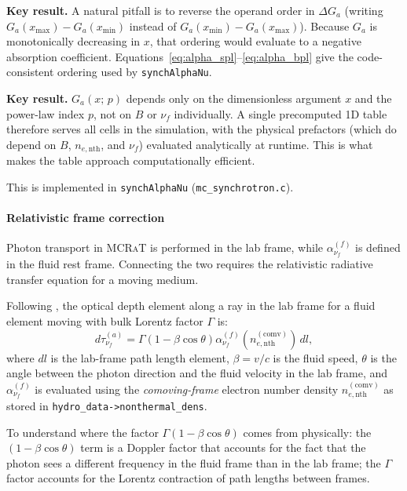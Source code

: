 \documentclass[12pt,a4paper]{article}
\newcommand{\nuf}{\nu_{\!f}}
\newcommand{\nenth}{n_{e,\mathrm{nth}}}
\newcommand{\code}[1]{\texttt{#1}}
\newcommand{\mcrat}{\textsc{MCRaT}}
\newenvironment{keyresult}{%
	\begin{framed}\noindent\textbf{Key result.}\quad}
	{\end{framed}}
\begin{document}
\begin{keyresult}
	A natural pitfall is to reverse the operand order in $\Delta G_a$
	(writing $G_a(x_{\max})-G_a(x_{\min})$ instead of
	$G_a(x_{\min})-G_a(x_{\max})$). Because $G_a$ is monotonically
	decreasing in $x$, that ordering would evaluate to a negative
	absorption coefficient. Equations~\eqref{eq:alpha_spl}--\eqref{eq:alpha_bpl}
	give the code-consistent ordering used by \code{synchAlphaNu}.
\end{keyresult}

\begin{keyresult}
	$G_a(x;\,p)$ depends only on the dimensionless argument $x$ and the
	power-law index $p$, not on $B$ or $\nuf$ individually.  A single
	precomputed 1D table therefore serves all cells in the simulation, with
	the physical prefactors (which do depend on $B$, $\nenth$, and $\nuf$)
	evaluated analytically at runtime.  This is what makes the table approach
	computationally efficient.
\end{keyresult}

This is implemented in \code{synchAlphaNu} (\code{mc\_synchrotron.c}).

\paragraph{Relativistic frame correction}
\label{sec:frame}

Photon transport in \mcrat{} is performed in the lab frame, while
$\alpha_{\nuf}^{(f)}$ is defined in the fluid rest frame.  Connecting
the two requires the relativistic radiative transfer equation for a
moving medium.

Following \citet{abramowicz1991}, the optical depth element along a ray
in the lab frame for a fluid element moving with bulk Lorentz factor
$\Gamma$ is:
\begin{equation}
	d\tau_{\nuf}^{(a)}
	= \Gamma\left(1 - \beta\cos\theta\right)
	\alpha_{\nuf}^{(f)}\!\left(\nenth^{(\mathrm{comv})}\right)
	\,dl,
	\label{eq:dtau}
\end{equation}
where $dl$ is the lab-frame path length element, $\beta = v/c$ is the
fluid speed, $\theta$ is the angle between the photon direction and the
fluid velocity in the lab frame, and $\alpha_{\nuf}^{(f)}$ is evaluated
using the \emph{comoving-frame} electron number density
$\nenth^{(\mathrm{comv})}$ as stored in \code{hydro\_data->nonthermal\_dens}.

To understand where the factor $\Gamma(1-\beta\cos\theta)$ comes from
physically: the $(1-\beta\cos\theta)$ term is a Doppler factor that
accounts for the fact that the photon sees a different frequency in the
fluid frame than in the lab frame; the $\Gamma$ factor accounts for the
Lorentz contraction of path lengths between frames.
\end{document}
